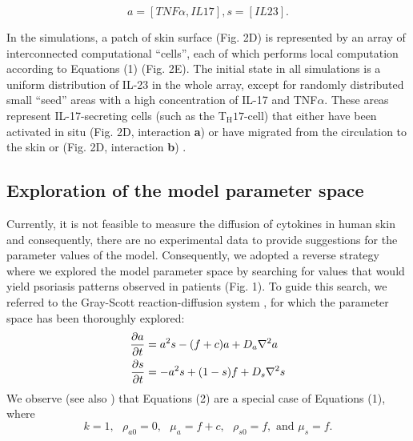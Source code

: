 \[a=[TNF\alpha, IL17], s=[IL23].\]

In the simulations, a patch of skin surface (Fig. 2D) is represented by an array of interconnected computational “cells”, each of which performs local computation according to Equations (1) (Fig. 2E). The initial state in all simulations is a uniform distribution of IL-23 in the whole array, except for randomly distributed small “seed” areas with a high concentration of IL-17 and TNF$\alpha$. These areas represent IL-17-secreting cells (such as the T$_{\text{H}}17$-cell) that either have been activated in situ (Fig. 2D, interaction \textbf{a}) or have migrated from the circulation to the skin or (Fig. 2D, interaction \textbf{b}) \citep{krueger2012}. 

\subsection{Exploration of the model parameter space}
Currently, it is not feasible to measure the diffusion of cytokines in human skin and consequently, there are no experimental data to provide suggestions for the parameter values of the model. Consequently, we adopted a reverse strategy where we explored the model parameter space by searching for values that would yield psoriasis patterns observed in patients (Fig. 1). To guide this search, we referred to the Gray-Scott reaction-diffusion system \citep{gray1984}, for which the parameter space has been thoroughly explored:
\begin{equation}
	\begin{aligned} \label{eq:gsPsoriasis}
	\frac{\partial a}{\partial t} &= a^2s-(f+c)a+ D_a \nabla^2 a \\
	\frac{\partial s}{\partial t} &= -a^2s+(1-s)f + D_s \nabla^2 s
	\end{aligned}
\end{equation}
We observe (see also \citep{yamamoto2010, yamamoto2011}) that Equations (2) are a special case of Equations (1), where
\[ k=1,\text{   }\rho_{a0}=0,\text{   }\mu_a=f+c,\text{   }\rho_{s0}=f,\text{ and }\mu_s=f.\]
